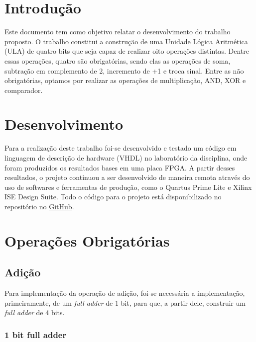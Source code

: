 \documentclass[a4paper, 12pt]{article}
\begin{document}
\newpage
{}

\section{Introdução}

Este documento tem como objetivo relatar o desenvolvimento do trabalho proposto. O trabalho constitui a construção de uma Unidade Lógica Aritmética (ULA) de quatro bits que seja capaz de realizar oito operações distintas. Dentre essas operações, quatro são obrigatórias, sendo elas as operações de soma, subtração em complemento de 2, incremento de +1 e troca sinal. Entre as não obrigatórias, optamos por realizar as operações de multiplicação, AND, XOR e comparador.
\section{Desenvolvimento}

Para a realização deste trabalho foi-se desenvolvido e testado um código em linguagem de descrição de hardware (VHDL) no laboratório da disciplina, onde foram produzidos os resultados bases em uma placa FPGA. A partir desses resultados, o projeto continuou a ser desenvolvido de maneira remota através do uso de softwares e ferramentas de produção, como o Quartus Prime Lite e Xilinx ISE Design Suite. Todo o código para o projeto está disponibilizado no repositório no \href{https://github.com/PedroHGLima/laboratorio-sd}{GitHub}.

\section{Operações Obrigatórias}


\subsection{Adição}


Para implementação da operação de adição, foi-se necessária a implementação, primeiramente, de um \textit{full adder} de 1 bit, para que, a partir dele, construir um \textit{full adder} de 4 bits.

\subsubsection{1 bit full adder}
\end{document}
